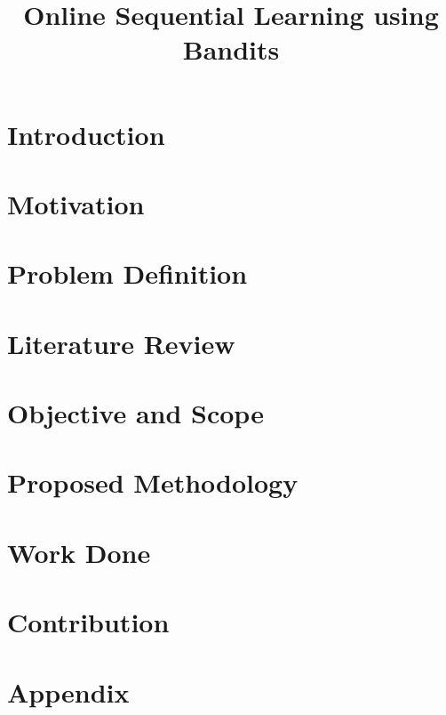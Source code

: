 \documentclass{colt2016} %
\title[Online Sequential Learning using Bandits]{Online Sequential Learning using Bandits}
\begin{document}
\maketitle



\section{Introduction}
\label{intro}


\section{Motivation}
\label{motivation}


\section{Problem Definition}
\label{probDef}


\section{Literature Review}
\label{review}


\section{Objective and Scope}
\label{objective}


\section{Proposed Methodology}
\label{methodology}


\section{Work Done}
\label{workDone}


\section{Contribution}
\label{contribution}


%




\section{Appendix}
\label{appendix}

\end{document}
